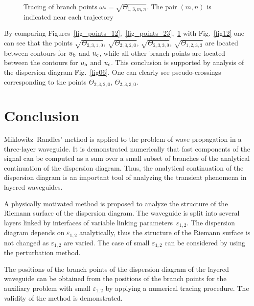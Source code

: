 \documentclass[12pt]{article}
\newcommand{\eps}{\varepsilon}
\begin{document}
\begin{figure}[ht]
\centerline{}
\caption{Tracing of branch points $\omega_* = \sqrt{\Theta_{1,3,m,n}}$. The pair $(m,n)$ is 
indicated near each trajectory} 
\label{fig_points_13}
\end{figure}

By comparing Figures~\ref{fig_points_12},~\ref{fig_points_23},~\ref{fig_points_13}
with Fig.~\ref{fig12} one can see that the points $\sqrt{\Theta_{2,3,1,0}}$,
$\sqrt{\Theta_{2,3,2,0}}$, $\sqrt{\Theta_{2,3,3,0}}$, $\sqrt{\Theta_{1,2,3,3}}$
are located between contours for $u_{\rm b}$ and $u_{\rm c}$, while all 
other branch points are located between the contours for $u_{\rm a}$ and $u_{\rm c}$. 
This conclusion is supported by analysis of the dispersion diagram Fig.~\ref{fig06}.
One can clearly see pseudo-crossings corresponding to the points
$\Theta_{2,3,2,0}$, $\Theta_{2,3,3,0}$.  


\section{Conclusion}

Miklowitz--Randles' method is applied to the problem of wave propagation in a three-layer waveguide. It is demonstrated numerically that fast components of the signal can be computed 
as a  sum over a small subset of branches of the analytical continuation of the dispersion diagram.
Thus, the analytical continuation of the dispersion diagram is an important tool of analyzing the 
transient phenomena in layered waveguides. 

A physically motivated method is proposed to analyze the structure of the Riemann surface of the 
dispersion diagram. The waveguide is split into several layers linked by interfaces of variable 
linking parameters~$\eps_{1,2}$. The dispersion diagram depends on $\eps_{1,2}$ analytically, 
thus the structure of the Riemann surface is not changed as $\eps_{1,2}$ are varied. The case of 
small $\eps_{1,2}$ can be considered by using the perturbation method.

The positions of the branch points of the dispersion diagram of the layered waveguide can be 
obtained from the positions of the branch points for the auxiliary problem with small $\eps_{1,2}$
by applying a numerical tracing procedure. The validity of the method is demonstrated.   
\end{document}
